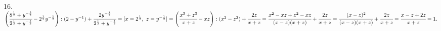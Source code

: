 16. $\left(\cfrac{8^\frac{1}{2}+y^{-\frac{3}{2}}}{2^\frac{1}{2}+y^{- \frac{1}{2}}}-
2^\frac{1}{2}y^{-\frac{1}{2}}\right):(2-y^{-1})+\cfrac{2y^{-\frac{1}{2}}}{2^\frac{1}{2}+y^{-\frac{1}{2}}}=[x=2^{\frac{1}{2}},\ z=y^{-\frac{1}{2}}]=
\left(\cfrac{x^3+z^3}{x+z}-xz\right):(x^2-z^2)+\cfrac{2z}{x+z}=\cfrac{x^2-xz+z^2-xz}{(x-z)(x+z)}+\cfrac{2z}{x+z}=
\cfrac{(x-z)^2}{(x-z)(x+z)}+\cfrac{2z}{x+z}=\cfrac{x-z+2z}{x+z}=1.$\\
